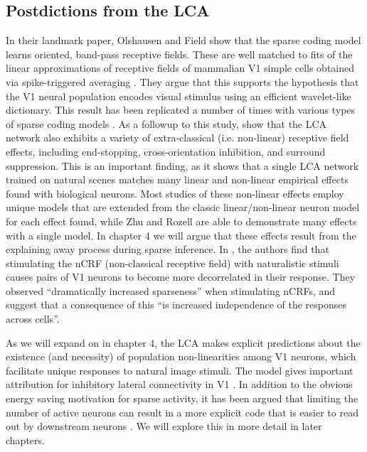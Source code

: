 \subsection{Postdictions from the LCA}
In their landmark paper, Olshausen and Field \citeyearpar{olshausen1996emergence} show that the sparse coding model learns oriented, band-pass receptive fields.
These are well matched to fits of the linear approximations of receptive fields of mammalian V1 simple cells obtained via spike-triggered averaging \parencite{hateren1998independent}.
They argue that this supports the hypothesis that the V1 neural population encodes visual stimulus using an efficient wavelet-like dictionary.
This result has been replicated a number of times with various types of sparse coding models \parencite{zylberberg2011sparse, zylberberg2013sparse, rehn2007network}.
As a followup to this study, \parencite{zhu2013visual} show that the LCA network also exhibits a variety of extra-classical (i.e. non-linear) receptive field effects, including end-stopping, cross-orientation inhibition, and surround suppression.
This is an important finding, as it shows that a single LCA network trained on natural scenes matches many linear and non-linear empirical effects found with biological neurons.
Most studies of these non-linear effects employ unique models that are extended from the classic linear/non-linear neuron model for each effect found, while Zhu and Rozell are able to demonstrate many effects with a single model.
In chapter 4 we will argue that these effects result from the explaining away process during sparse inference. %
In \parencite{vinje2000sparse}, the authors find that stimulating the nCRF (non-classical receptive field) with naturalistic stimuli causes pairs of V1 neurons to become more decorrelated in their response.
They observed ``dramatically increased sparseness'' when stimulating nCRFs, and suggest that a consequence of this ``is increased independence of the responses across cells''.

As we will expand on in chapter 4, the LCA makes explicit predictions about the existence (and necessity) of population non-linearities among V1 neurons, which facilitate unique responses to natural image stimuli. %
The model gives important attribution for inhibitory lateral connectivity in V1 \parencite{zhu2015modeling}.
In addition to the obvious energy saving motivation for sparse activity, it has been argued that limiting the number of active neurons can result in a more explicit code that is easier to read out by downstream neurons \parencite{olshausen2003principles}.
We will explore this in more detail in later chapters.


